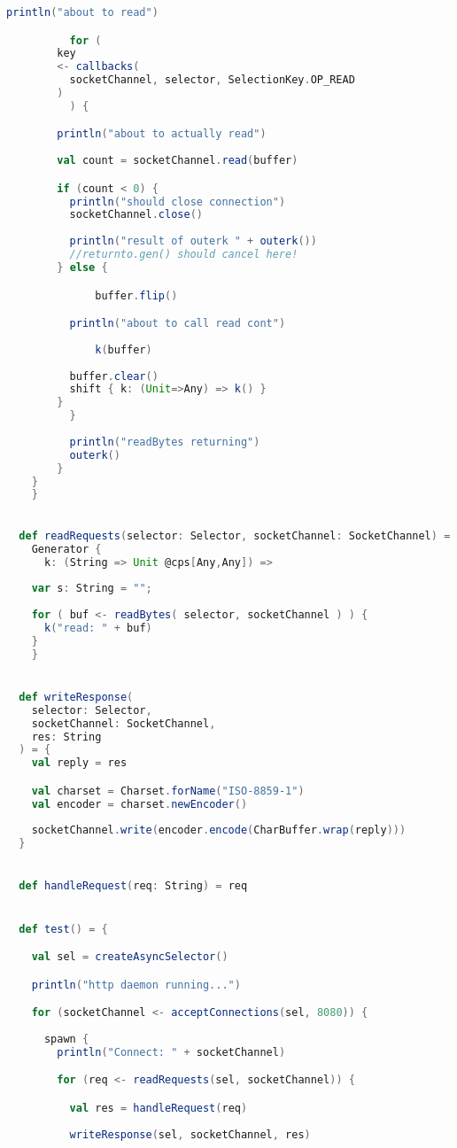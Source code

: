 \begin{lstlisting}[language=Scala]
	      println("about to read")

  	      for (
		key
		<- callbacks(
		  socketChannel, selector, SelectionKey.OP_READ
		)
	      ) {

		println("about to actually read")
        
  		val count = socketChannel.read(buffer)

  		if (count < 0) {
		  println("should close connection")
  		  socketChannel.close()
  				
  		  println("result of outerk " + outerk())
  		  //returnto.gen() should cancel here!
  		} else {

    		  buffer.flip()

		  println("about to call read cont")
		  
    		  k(buffer)
		  
  		  buffer.clear()
  		  shift { k: (Unit=>Any) => k() }
		}
  	      }
  	      
  	      println("readBytes returning")
  	      outerk()
	    }
  	}
    }
  

  def readRequests(selector: Selector, socketChannel: SocketChannel) =
    Generator {
      k: (String => Unit @cps[Any,Any]) =>
    
	var s: String = "";
    
	for ( buf <- readBytes( selector, socketChannel ) ) {
	  k("read: " + buf)
	}
    }


  def writeResponse(
    selector: Selector,
    socketChannel: SocketChannel,
    res: String
  ) = {
    val reply = res

    val charset = Charset.forName("ISO-8859-1")
    val encoder = charset.newEncoder()
    
    socketChannel.write(encoder.encode(CharBuffer.wrap(reply)))
  }


  def handleRequest(req: String) = req


  def test() = {

    val sel = createAsyncSelector()

    println("http daemon running...")

    for (socketChannel <- acceptConnections(sel, 8080)) {
      
      spawn {
    	println("Connect: " + socketChannel)

      	for (req <- readRequests(sel, socketChannel)) {

      	  val res = handleRequest(req)
		
      	  writeResponse(sel, socketChannel, res)
    	  

\end{lstlisting}

